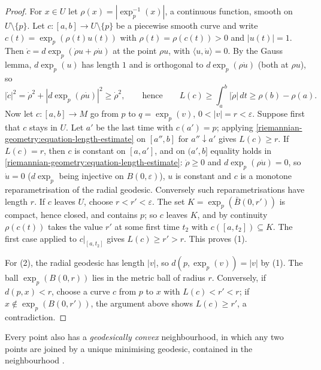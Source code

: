 \begin{proof}
For $x \in U$ let $\rho(x) = |\exp_p^{-1}(x)|$, a continuous function, smooth on $U \setminus \{p\}$. Let $c \colon [a, b] \to U \setminus \{p\}$ be a piecewise smooth curve and write $c(t) = \exp_p(\rho(t)u(t))$ with $\rho(t) = \rho(c(t)) > 0$ and $|u(t)| = 1$.
Then $\dot c = d\exp_p(\dot\rho u + \rho\dot u)$ at the point $\rho u$, with $\langle u, \dot u\rangle = 0$. By the Gauss lemma, $d\exp_p(u)$ has length $1$ and is orthogonal to $d\exp_p(\rho\dot u)$ (both at $\rho u$), so
\begin{equation}\label{riemannian-geometry:equation-length-estimate}
|\dot c|^2 = \dot\rho^2 + |d\exp_p(\rho\dot u)|^2 \geq \dot\rho^2, \qquad\text{hence}\qquad L(c) \geq \int_a^b|\dot\rho|\,dt \geq \rho(b) - \rho(a).
\end{equation}
Now let $c \colon [a, b] \to M$ go from $p$ to $q = \exp_p(v)$, $0 < |v| = r < \varepsilon$. Suppose first that $c$ stays in $U$. Let $a'$ be the last time with $c(a') = p$; applying \eqref{riemannian-geometry:equation-length-estimate} on $[a'', b]$ for $a'' \downarrow a'$ gives $L(c) \geq r$. If
$L(c) = r$, then $c$ is constant on $[a, a']$, and on $(a', b]$ equality holds in \eqref{riemannian-geometry:equation-length-estimate}: $\dot\rho \geq 0$ and $d\exp_p(\rho\dot u) = 0$, so $\dot u = 0$ ($d\exp_p$ being injective on $B(0, \varepsilon)$), $u$ is constant and $c$ is a monotone
reparametrisation of the radial geodesic. Conversely such reparametrisations have length $r$. If $c$ leaves $U$, choose $r < r' < \varepsilon$. The set $K = \exp_p(\bar B(0, r'))$ is compact, hence closed, and contains $p$; so $c$
leaves $K$, and by continuity $\rho(c(t))$ takes the value $r'$ at some first time $t_2$ with $c([a, t_2]) \subseteq K$. The first case applied to $c|_{[a, t_2]}$ gives $L(c) \geq r' > r$. This proves (1).

For (2), the radial geodesic has length $|v|$, so $d(p, \exp_p(v)) = |v|$ by (1). The ball $\exp_p(B(0, r))$ lies in the metric ball of radius $r$. Conversely, if $d(p, x) < r$, choose a curve $c$ from $p$ to $x$ with $L(c) < r' < r$; if
$x \notin \exp_p(B(0, r'))$, the argument above shows $L(c) \geq r'$, a contradiction.
\end{proof}

\begin{remark}\label{riemannian-geometry:remark-convex}
Every point also has a \emph{geodesically convex} neighbourhood, in which any two points are joined by a unique minimising geodesic, contained in the neighbourhood \cite[Chapter 3]{do-carmo-riemannian}.
\end{remark}

